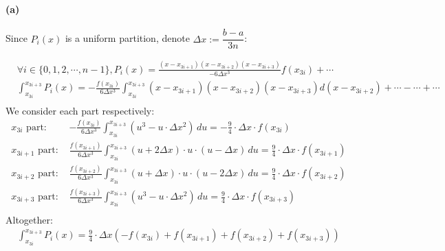\documentclass{article}
\begin{document}
\section{}
\paragraph{(a)}
Since $P_i(x)$ is a uniform partition, denote $\Delta x := \dfrac{b-a}{3n}$:

$$\begin{aligned}
    &\forall i \in \{0,1,2,\cdots,n-1\}, P_i(x) = \frac{(x-x_{3i+1})(x-x_{3i+2})(x-x_{3i+3})}{-6\Delta x^3} f(x_{3i}) + \cdots \\
    &\int_{x_{3i}}^{x_{3i+3}} P_i(x) = -\frac{f(x_{3i})}{6\Delta x^3} \int_{x_{3i}}^{x_{3i+3}} (x-x_{3i+1})(x-x_{3i+2})(x-x_{3i+3}) d\left(x-x_{3i+2}\right) + \cdots - \cdots + \cdots \\
\end{aligned}$$
We consider each part respectively:
$$\begin{aligned} x_{3i} \text{ part: }& -\frac{f(x_{3i})}{6\Delta x^3} \int_{x_{3i}}^{x_{3i+3}} (u^3-u\cdot\Delta x^2) \,du = -\frac{9}{4} \cdot \Delta x \cdot f(x_{3i}) \\
x_{3i+1} \text{ part: }& \frac{f(x_{3i+1})}{6\Delta x^3} \int_{x_{3i}}^{x_{3i+3}} (u+2\Delta x)\cdot u\cdot (u-\Delta x) \,du = \frac{9}{4} \cdot \Delta x \cdot f(x_{3i+1}) \\
x_{3i+2} \text{ part: }& \frac{f(x_{3i+2})}{6\Delta x^3} \int_{x_{3i}}^{x_{3i+3}} (u+\Delta x)\cdot u\cdot (u-2\Delta x) \,du = \frac{9}{4} \cdot \Delta x \cdot f(x_{3i+2}) \\
x_{3i+3} \text{ part: }& \frac{f(x_{3i+3})}{6\Delta x^3} \int_{x_{3i}}^{x_{3i+3}} (u^3-u\cdot\Delta x^2) \,du = \frac{9}{4} \cdot \Delta x \cdot f(x_{3i+3}) \\
\end{aligned}$$
Altogether:
$$\begin{aligned}
    \int_{x_{3i}}^{x_{3i+3}} P_i(x) = \frac{9}{4} \cdot \Delta x \left( -f(x_{3i}) + f(x_{3i+1}) + f(x_{3i+2}) + f(x_{3i+3}) \right)
\end{aligned}$$
\end{document}
